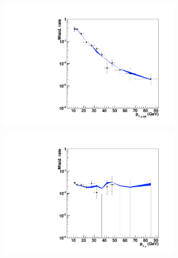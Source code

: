 \begin{figure}
        \begin{subfigure}[b]{0.33\textwidth}
		\includegraphics[width=\textwidth]{4_Analisys/pics/8TeV/plots/fakerates/m_mmt_subleading_kNN_muonJetPt.pdf}
                \caption{}
        \end{subfigure}%
        \begin{subfigure}[b]{0.33\textwidth}
                \includegraphics[width=\textwidth]{4_Analisys/pics/8TeV/plots/fakerates/m_mmt_subleading_kNN_muonPt.pdf}
                \caption{}
        \end{subfigure}
        \begin{subfigure}[b]{0.33\textwidth}

\end{subfigure}
\end{figure}
